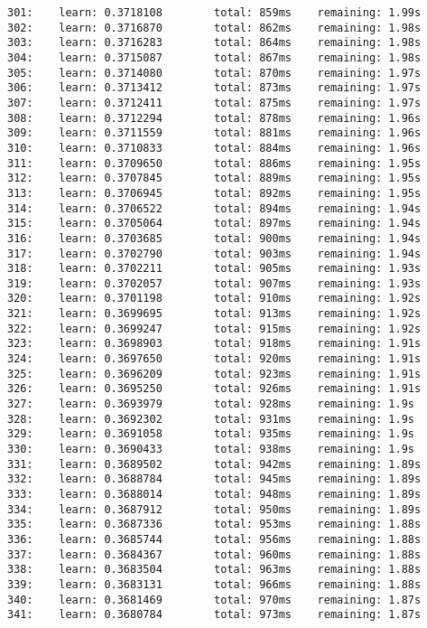 \documentclass[11pt]{article}
\begin{document}
\begin{Verbatim}[commandchars=\\\{\}]
301:    learn: 0.3718108        total: 859ms    remaining: 1.99s
302:    learn: 0.3716870        total: 862ms    remaining: 1.98s
303:    learn: 0.3716283        total: 864ms    remaining: 1.98s
304:    learn: 0.3715087        total: 867ms    remaining: 1.98s
305:    learn: 0.3714080        total: 870ms    remaining: 1.97s
306:    learn: 0.3713412        total: 873ms    remaining: 1.97s
307:    learn: 0.3712411        total: 875ms    remaining: 1.97s
308:    learn: 0.3712294        total: 878ms    remaining: 1.96s
309:    learn: 0.3711559        total: 881ms    remaining: 1.96s
310:    learn: 0.3710833        total: 884ms    remaining: 1.96s
311:    learn: 0.3709650        total: 886ms    remaining: 1.95s
312:    learn: 0.3707845        total: 889ms    remaining: 1.95s
313:    learn: 0.3706945        total: 892ms    remaining: 1.95s
314:    learn: 0.3706522        total: 894ms    remaining: 1.94s
315:    learn: 0.3705064        total: 897ms    remaining: 1.94s
316:    learn: 0.3703685        total: 900ms    remaining: 1.94s
317:    learn: 0.3702790        total: 903ms    remaining: 1.94s
318:    learn: 0.3702211        total: 905ms    remaining: 1.93s
319:    learn: 0.3702057        total: 907ms    remaining: 1.93s
320:    learn: 0.3701198        total: 910ms    remaining: 1.92s
321:    learn: 0.3699695        total: 913ms    remaining: 1.92s
322:    learn: 0.3699247        total: 915ms    remaining: 1.92s
323:    learn: 0.3698903        total: 918ms    remaining: 1.91s
324:    learn: 0.3697650        total: 920ms    remaining: 1.91s
325:    learn: 0.3696209        total: 923ms    remaining: 1.91s
326:    learn: 0.3695250        total: 926ms    remaining: 1.91s
327:    learn: 0.3693979        total: 928ms    remaining: 1.9s
328:    learn: 0.3692302        total: 931ms    remaining: 1.9s
329:    learn: 0.3691058        total: 935ms    remaining: 1.9s
330:    learn: 0.3690433        total: 938ms    remaining: 1.9s
331:    learn: 0.3689502        total: 942ms    remaining: 1.89s
332:    learn: 0.3688784        total: 945ms    remaining: 1.89s
333:    learn: 0.3688014        total: 948ms    remaining: 1.89s
334:    learn: 0.3687912        total: 950ms    remaining: 1.89s
335:    learn: 0.3687336        total: 953ms    remaining: 1.88s
336:    learn: 0.3685744        total: 956ms    remaining: 1.88s
337:    learn: 0.3684367        total: 960ms    remaining: 1.88s
338:    learn: 0.3683504        total: 963ms    remaining: 1.88s
339:    learn: 0.3683131        total: 966ms    remaining: 1.88s
340:    learn: 0.3681469        total: 970ms    remaining: 1.87s
341:    learn: 0.3680784        total: 973ms    remaining: 1.87s

\end{Verbatim}
\end{document}
